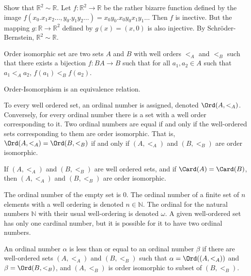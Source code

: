     \begin{example}
        Show that $\mathbb{R}^{2}\sim\mathbb{R}$.
        Let $f:\mathbb{R}^{2}\rightarrow\mathbb{R}$
        be the rather bizarre function defined by the image
        $f(x_{0}.x_{1}x_{2}\hdots,y_{0}.y_{1}y_{2}\hdots)%
         =x_{0}y_{0}.x_{0}y_{0}x_{1}y_{1}\hdots$ Then
        $f$ is inective. But the mapping
        $g:\mathbb{R}\rightarrow\mathbb{R}^{2}$
        defined by $g(x)=(x,0)$ is also injective.
        By Schr\"{o}der-Bernstein,
        $\mathbb{R}^{2}\sim\mathbb{R}$.
    \end{example}
    \begin{definition}
       Order isomorphic set are two sets $A$ and $B$
       with well orders $<_{A}$ and $<_{B}$ such that
       there exists a bijection $f:{B}A\rightarrow{B}$
       such that for all $a_{1},a_{2}\in{A}$ such that
       $a_{1}<_{A}a_{2}$, $f(a_{1})<_{B}f(a_{2})$.
    \end{definition}
    \begin{theorem}
       Order-Isomorphism is an equivalence relation.
    \end{theorem}
    To every well ordered set, an ordinal number is
    assigned, denoted $\Ord(A,<_{A})$. Conversely,
    for every ordinal number there is a set with a
    well order corresponding to it. Two ordinal numbers
    are equal if and only if the well-ordered sets
    corresponding to them are order isomorphic.
    That is,
    $\Ord(A,<_{A})=\Ord(B,<_{B})$ if and only if
    $(A,<_{A})$ and $(B,<_{B})$ are order isomorphic.
    \begin{theorem}
       If $(A,<_{A})$ and $(B,<_{B})$ are well ordered
       sets, and if $\Card(A)=\Card(B)$, then
       $(A,<_{A})$ and $(B,<_{B})$ are order
       isomorphic.
    \end{theorem}
    The ordinal number of the empty set is $0$. The
    ordinal number of a finite set of $n$ elements with
    a well ordering is denoted $n\in\mathbb{N}$.
    The ordinal for the natural numbers $\mathbb{N}$
    with their usual well-ordering is denoted $\omega$.
    A given well-ordered set has only one cardinal number,
    but it is possible for it to have two ordinal numbers.
    \begin{definition}
        An ordinal number $\alpha$ is less than or equal to an ordinal
        number $\beta$ if there are well-ordered sets $(A,<_{A})$ and
        $(B,<_{B})$ such that $\alpha=\Ord((A,<_{A}))$ and
        $\beta=\Ord(B,<_{B})$, and $(A,<_{B})$ is order isomorphic to
        subset of $(B,<_{B})$.
    \end{definition}
